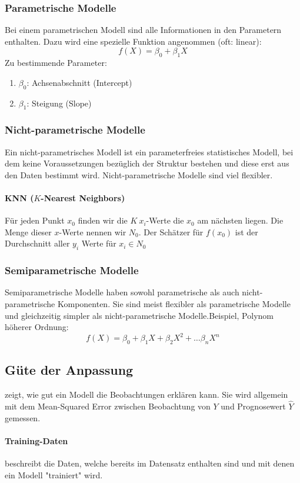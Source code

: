 \documentclass[a3paper, 8pt]{extarticle}
\begin{document}
\begin{multicols*}{5}
\subsubsection{Parametrische Modelle}
Bei einem parametrischen Modell sind alle Informationen in den Parametern enthalten. Dazu wird eine spezielle Funktion angenommen (oft: linear):
\[f(X)=\beta_0+\beta_1X\]
Zu bestimmende Parameter:
\begin{enumerate}
    \item[] $\beta_0$: Achsenabschnitt (Intercept)
    \item[] $\beta_1$: Steigung (Slope)
\end{enumerate}

\subsubsection{Nicht-parametrische Modelle}Ein nicht-parametrisches Modell ist ein parameterfreies statistisches Modell, bei dem keine Voraussetzungen bezüglich der Struktur bestehen und diese erst aus den Daten bestimmt wird. Nicht-parametrische Modelle sind viel flexibler.

\paragraph{KNN ($K$-Nearest Neighbors)}
Für jeden Punkt $x_0$ finden wir die $K\:x_i$-Werte die $x_0$ am nächsten liegen. Die Menge dieser $x$-Werte nennen wir $N_0$. Der Schätzer für $f(x_0)$ ist der Durchschnitt aller $y_i$ Werte für $x_i \in N_0$

\subsubsection{Semiparametrische Modelle}
Semiparametrische Modelle haben sowohl parametrische als auch nicht-parametrische Komponenten. Sie sind meist flexibler als parametrische Modelle und gleichzeitig simpler als nicht-parametrische Modelle.Beispiel, Polynom höherer Ordnung:
\[f(X)=\beta_0+\beta_1X+\beta_2X^2+ \dots \beta_nX^n\]

\subsection{Güte der Anpassung} zeigt, wie gut ein Modell die Beobachtungen erklären kann. Sie wird allgemein mit dem Mean-Squared Error zwischen Beobachtung von $Y$ und Prognosewert $\hat{Y}$ gemessen.

\paragraph{Training-Daten} beschreibt die Daten, welche bereits im Datensatz enthalten sind und mit denen ein Modell "trainiert" wird.


\end{multicols*}
\end{document}
